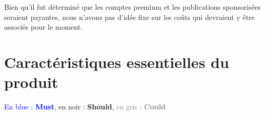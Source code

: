 \documentclass[11pt]{article}
\begin{document}
Bien qu'il fut déterminé que les comptes premium et les publications sponsorisées seraient payantes, nous n'avons pas d'idée fixe sur les coûts qui devraient y être associés pour le moment.

%






\section{Caractéristiques essentielles du produit}


\textcolor{blue}{En blue : \textbf{Must}}, en noir : \textbf{Should}, \textcolor{gray}{en gris : \textbf{Could}}
\end{document}
